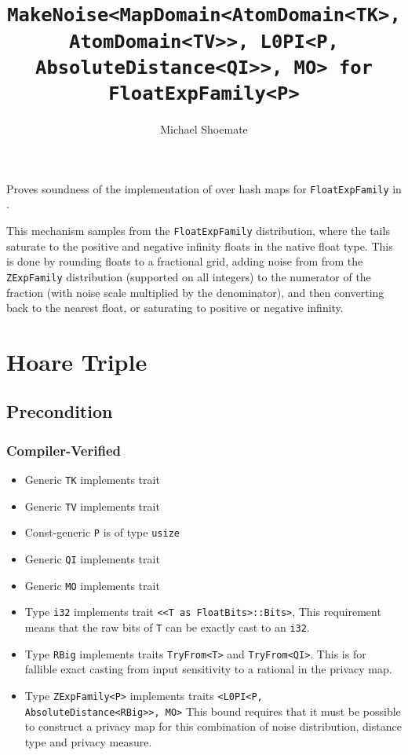 \documentclass{article}
\title{\texttt{MakeNoise<MapDomain<AtomDomain<TK>, AtomDomain<TV>>, L0PI<P, AbsoluteDistance<QI>>, MO> for FloatExpFamily<P>}}
\author{Michael Shoemate}
\date{}
\begin{document}
\maketitle

\contrib
Proves soundness of the implementation of  over hash maps
for \texttt{FloatExpFamily} in .

This mechanism samples from the \texttt{FloatExpFamily} distribution, 
where the tails saturate to the positive and negative infinity floats in the native float type.
This is done by rounding floats to a fractional grid, 
adding noise from from the \texttt{ZExpFamily} distribution (supported on all integers) 
to the numerator of the fraction (with noise scale multiplied by the denominator),
and then converting back to the nearest float, or saturating to positive or negative infinity.

\section{Hoare Triple}
\subsection*{Precondition}
\subsubsection*{Compiler-Verified}

\begin{itemize}
    \item Generic \texttt{TK} implements trait 
    \item Generic \texttt{TV} implements trait 
    \item Const-generic \texttt{P} is of type \texttt{usize}
    \item Generic \texttt{QI} implements trait 
    \item Generic \texttt{MO} implements trait 
    \item Type \texttt{i32} implements trait \texttt{<<T as FloatBits>::Bits>},
        This requirement means that the raw bits of \texttt{T} can be exactly cast to an \texttt{i32}.
    \item Type \texttt{RBig} implements traits \texttt{TryFrom<T>} and \texttt{TryFrom<QI>}.
        This is for fallible exact casting from input sensitivity to a rational in the privacy map.
    \item Type \texttt{ZExpFamily<P>} implements traits \texttt{<L0PI<P, AbsoluteDistance<RBig>>, MO>}
        This bound requires that it must be possible to construct a privacy map for this combination of noise distribution, distance type and privacy measure.
\end{itemize}
\end{document}
